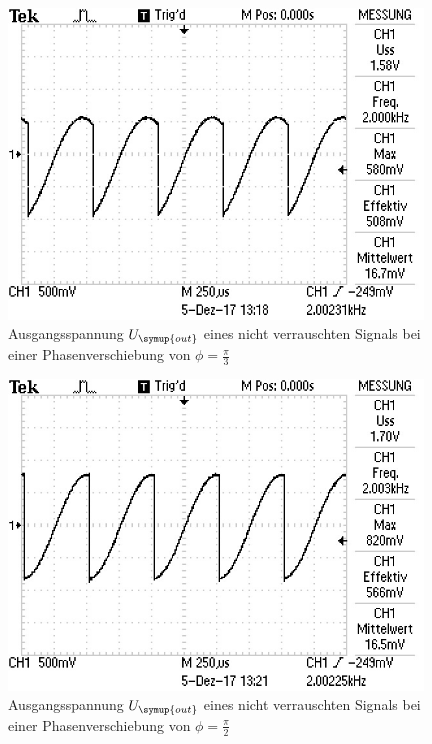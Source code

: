 \begin{figure}
  \centering
  \includegraphics[width=11cm]{data/phase_60.jpg}
  \caption{Ausgangsspannung $U_{\symup{out}}$ eines nicht verrauschten Signals bei einer Phasenverschiebung
  von $\phi=\frac{\pi}{3}$}
  \label{fig:phase_60}
\end{figure}

\begin{figure}
  \centering
  \includegraphics[width=11cm]{data/phase_90.jpg}
  \caption{Ausgangsspannung $U_{\symup{out}}$ eines nicht verrauschten Signals bei einer Phasenverschiebung
  von $\phi=\frac{\pi}{2}$}
  \label{fig:phase_90}
\end{figure}





